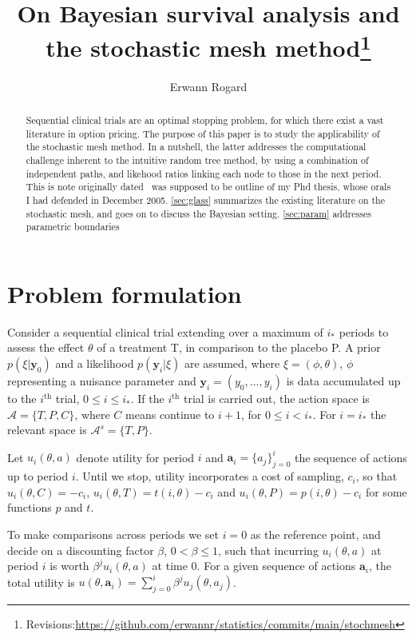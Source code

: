 \documentclass[11pt]{article}
\title{On Bayesian survival analysis and the stochastic mesh method\footnote{Revisions:\url{https://github.com/erwannr/statistics/commits/main/stochmesh}}}
\author{Erwann Rogard}
\date{\ThisDate}
\begin{document}
\maketitle

\begin{abstract}Sequential clinical trials are an optimal stopping problem, for which there exist a vast literature in option pricing. The purpose of this paper is to study the applicability of the stochastic mesh method. In a nutshell, the latter addresses the computational challenge inherent to the intuitive random tree method, by using a combination of independent paths, and likehood ratios linking each node to those in the next period. This is note originally dated \origDate~was supposed to be outline of my Phd thesis, whose orals I had defended in December 2005. \autoref{sec:glass} summarizes the existing literature on the stochastic mesh, and goes on to discuss the Bayesian setting. \autoref{sec:param} addresses parametric boundaries\end{abstract}


\section{Problem formulation}\label{sec:glass}
Consider a sequential clinical trial extending over a maximum of $i_*$ periods to assess the effect $\theta$ of a treatment T, in comparison to the placebo P. A prior
$\nonumber p(\xi|\mathbf{y}_0)$ and a likelihood $p(\mathbf{y}_i|\xi)$ are assumed, 
where $\xi=(\phi,\theta)$, $\phi$ representing a nuisance parameter and $\mathbf{y}_i=(y_0,...,y_i)$ is data accumulated up to the $i^{\mathrm{th}}$ trial, $0\leq i\leq i_*$. If the $i^{\mathrm{th}}$ trial is carried out, the action space is $\mathcal{A}=\{T,P,C\}$, where $C$ means continue to $i+1$, for $0\leq i<i_*$. For $i=i_*$ the relevant space is $\mathcal{A}^{s}=\{T,P\}$.

Let $u_i(\theta,a)$ denote utility for period $i$ and $\mathbf{a}_i=\{a_j\}_{j=0}^i$ the sequence of actions up to period $i$. Until we stop, utility incorporates a cost of sampling, $c_i$, so that $u_i(\theta,C)=-c_i$, $u_i(\theta,T)=t(i,\theta)-c_i$ and $u_i(\theta,P)=p(i,\theta)-c_i$ for some functions $p$ and $t$. 

To make comparisons across periods we set $i=0$ as the reference point, and decide on a discounting factor $\beta$, $0<\beta\leq 1$, such that incurring $u_i(\theta,a)$ at period $i$ is worth $\beta^ j u_i(\theta,a)$ at time $0$. For a given sequence of actions $\mathbf{a}_i$, the total utility is $u(\theta,\mathbf{a}_i)=\sum_{j=0}^i \beta^j u_j(\theta,a_j)$.
\end{document}
